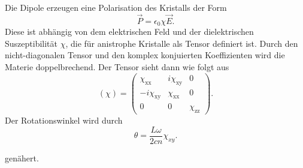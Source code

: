Die Dipole erzeugen eine Polarisation des Kristalls der Form
\begin{equation*}
    \vec{P} = \epsilon_0 \chi \vec{E}.
\end{equation*}
Diese ist abhängig von dem elektrischen Feld und der dielektrischen Suszeptibilität $\chi$, die für anistrophe
Kristalle als Tensor definiert ist. Durch den nicht-diagonalen Tensor und den komplex konjuierten Koeffizienten
wird die Materie doppelbrechend.\newline
Der Tensor sieht dann wie folgt aus
\begin{equation*}
    ( \chi ) =
    \begin{pmatrix}
      \chi_{\text{xx}} & i\chi_{\text{xy}} & 0 \\
      -i \chi_{\text{xy}}& \chi_{\text{xx}} & 0 \\
      0& 0 & \chi_{\text{zz}}
      \end{pmatrix}.
\end{equation*}
Der Rotationswinkel wird durch
\begin{equation}
  \theta = \frac{L \omega}{2 c n} \chi_{xy}.
  \label{eqn:1}
\end{equation}

genähert.

